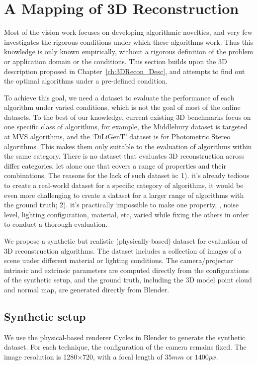 
\chapter{A Mapping of 3D Reconstruction}
\label{ch:3DRecon_Mapping}
Most of the vision work focuses on developing algorithmic novelties, and very few investigates the rigorous conditions under which these algorithms work. Thus this knowledge is only known empirically, without a rigorous definition of the problem or application domain or the conditions. This section builds upon the 3D description proposed in Chapter~\ref{ch:3DRecon_Desc}, and attempts to find out the optimal algorithms under a pre-defined condition.

To achieve this goal, we need a dataset to evaluate the performance of each algorithm under varied conditions, which is not the goal of most of the online datasets. To the best of our knowledge, current existing 3D benchmarks focus on one specific class of algorithms, for example, the Middlebury dataset is targeted at MVS algorithms, and the `DiLiGenT' dataset is for Photometric Stereo algorithms. This makes them only suitable to the evaluation of algorithms within the same category. There is no dataset that evaluates 3D reconstruction across differ categories, let alone one that covers a range of properties and their combinations. The reasons for the lack of such dataset is: 1). it's already tedious to create a real-world dataset for a specific category of algorithms, it would be even more challenging to create a dataset for a larger range of algorithms with the ground truth; 2). it's practically impossible to make one property, \eg, noise level, lighting configuration, material, etc, varied while fixing the others in order to conduct a thorough evaluation.

We propose a synthetic but realistic (physically-based) dataset for evaluation of 3D reconstruction algorithms. The dataset includes a collection of images of a scene under different material or lighting conditions. The camera/projector intrinsic and extrinsic parameters are computed directly from the configurations of the synthetic setup, and the ground truth, including the 3D model point cloud and normal map, are generated directly from Blender.

\section{Synthetic setup}
We use the physical-based renderer Cycles in Blender to generate the synthetic dataset. For each technique, the configuration of the camera remains fixed. The image resolution is 1280$\times$720, with a focal length of $35mm$ or $1400px$.

